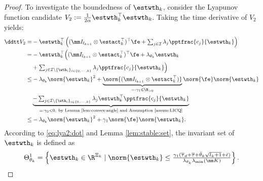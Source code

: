 \documentclass[journal]{IEEEtran}
\begin{document}
\begin{proof}
To investigate the boundedness of $\estwth_k$, consider the Lyapunov function candidate $V_2:=\tfrac{1}{2\alpha}\estwth_k^\top \estwth_k$.
Taking the time derivative of $V_2$ yields:
\begin{equation}
    \begin{aligned}
        \ddtt  V_2 
        =& 
        -\estwth_k^\top 
        \left(
            (\mm I_{l_{k+1}}\otimes \estact_k^\top)^\top
            \fe
            +
            \textstyle\sum_{j\in\mathcal{I}}
            \lambda_j 
            \pptfrac{c_j}{\estwth_k}
        \right)
        \\
        =&
        -\estwth_k^\top 
        \Big(
            (\mm I_{l_{k+1}}\otimes \estact_k^\top)^\top
            \fe
            +
            \lambda_{\theta_k}\estwth_k
        \\
        &
            +
            \textstyle\sum_{
                j\in\mathcal{I}\setminus \{\wth_i\}_{i\in\{0,\cdots,k\}}
            }
            \lambda_j 
            \pptfrac{c_j}{\estwth_k}
        \Big)
        \\
        \le&
        -
        \lambda_{\theta_k}\norm{\estwth_k}^2
        +
        \underbrace{
            \norm{(\mm I_{l_{k+1}}\otimes {\estact}_k^\top)}
        }_{=:{\gamma}_1\in\R_{>0}}
        \norm{\fe}
        \norm{\estwth_k}
        \\
        &
        \underbrace{
            -
            \textstyle\sum_{
                j\in\mathcal{I}\setminus \{\wth_i\}_{i\in\{0,\cdots,k\}}
            }
            \lambda_j 
            \estwth_k^\top \pptfrac{c_j}{\estwth_k}
        }_{=:{\gamma}_2<0,\ \text{by Lemma \ref{lem:convex:angle} and Assumption \ref{assum:LICQ}}}
        \\
        \le&
        -
        \lambda_{\theta_k}\norm{\estwth_k}^2
        +
        {\gamma}_1     
        \norm{\fe}
        \norm{\estwth_k}
        .
    \end{aligned}
    \label{eq:lya2:dot}
\end{equation}
According to \eqref{eq:lya2:dot} and Lemma \ref{lem:stable:set}, the invariant set of $\estwth_k$ is defined as
\begin{equation}
    \Theta_{\theta_k}^{1} 
    = 
    \left\{ 
        \estwth_k \in \R^{\Xi_{k}} 
        \mid 
        \norm{\estwth_k} 
        \le 
        \tfrac{
            {\gamma}_1
            (
                \overline\tau_d
                +
                \overline\tau
                +
                \bar{\theta}_k\sqrt{l_{k}+1}
                +
                \bar{\epsilon}
            )
        }{
            \lambda_{\theta_k}\lambda_{\min}(\mm K)
        }
    \right\}
    .
    \label{eq:invariant:c1:wth}
\end{equation}


\end{proof}
\end{document}

